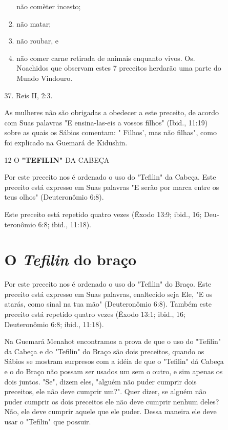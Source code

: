\begin{itemize}
\begin{enumrate}
\begin{itemize}
\begin{itemize}
\begin{enumerate}
 não comèter incesto;
 
\item
 
 não matar;
 
\item
 
 não roubar, e
 
\item
 
 não comer carne retirada de animais enquanto vivos. Os. Noachidos que
 obser­vam estes 7 preceitos herdarão uma parte do Mundo Vindouro.
 
\end{enumerate}


37. Reis II, 2:3.



As mulheres não são obrigadas a obedecer a este preceito, de acor­do com
Suas palavras "E ensina-las-eis a vossos filhos" (Ibid., 11:19) sobre as
quais os Sábios comentam: " Filhos', mas não filhas", como foi explicado
na Guemará de Kidushin.

12 O \textbf{"TEFILIN"} DA CABEÇA

Por este preceito nos é ordenado o uso do "Tefilin" da Cabeça. Este
preceito está expresso em Suas palavras "E serão por marca entre os teus
olhos" (Deuteronômio 6:8).

Este preceito está repetido quatro vezes (Êxodo 13:9; ibid., 16;
Deu­teronômio 6:8; ibid., 11:18).

\section{O \emph{Tefilin} do braço}

Por este preceito nos é ordenado o uso do "Tefilin" do Braço. Este
preceito está expresso em Suas palavras, enaltecido seja Ele, "E os
atarás, como sinal na tua mão" (Deuteronômio 6:8). Também este preceito
está repetido qua­tro vezes (Êxodo 13:1; ibid., 16; Deuteronômio 6:8;
ibid., 11:18).

Na Guemará Menahot encontramos a prova de que o uso do "Tefi­lin" da
Cabeça e do "Tefilin" do Braço são dois preceitos, quando os Sábios se
mostram surpresos com a idéia de que o "Tefilin" dá Cabeça e o do Braço
não possam ser usados um sem o outro, e sim apenas os dois juntos. "Se",
di­zem eles, "alguém não puder cumprir dois preceitos, ele não deve
cumprir um?". Quer dizer, se alguém não puder cumprir os dois preceitos
ele não deve cum­prir nenhum deles? Não, ele deve cumprir aquele que ele
puder. Dessa maneira ele deve usar o "Tefilin" que possuir.


\end{itemize}
\end{itemize}
\end{enumrate}
\end{itemize}
